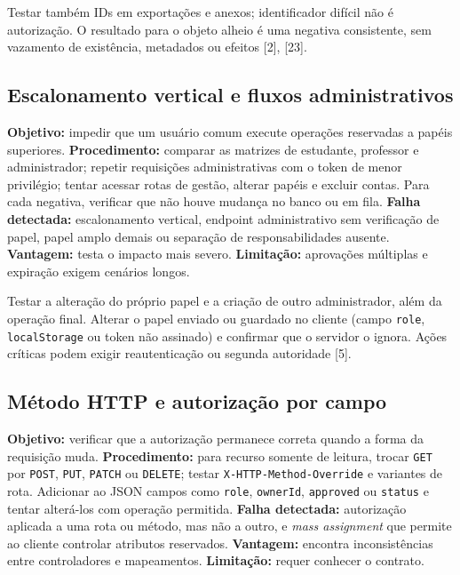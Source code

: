 Testar também IDs em exportações e anexos; identificador difícil não é
autorização. O resultado para o objeto alheio é uma negativa
consistente, sem vazamento de existência, metadados ou efeitos {[}2{]},
{[}23{]}.

\subsection{Escalonamento vertical e fluxos
administrativos}\label{escalonamento-vertical-e-fluxos-administrativos}

\textbf{Objetivo:} impedir que um usuário comum execute operações
reservadas a papéis superiores. \textbf{Procedimento:} comparar as
matrizes de estudante, professor e administrador; repetir requisições
administrativas com o token de menor privilégio; tentar acessar rotas de
gestão, alterar papéis e excluir contas. Para cada negativa, verificar
que não houve mudança no banco ou em fila. \textbf{Falha detectada:}
escalonamento vertical, endpoint administrativo sem verificação de
papel, papel amplo demais ou separação de responsabilidades ausente.
\textbf{Vantagem:} testa o impacto mais severo. \textbf{Limitação:}
aprovações múltiplas e expiração exigem cenários longos.

Testar a alteração do próprio papel e a criação de outro administrador,
além da operação final. Alterar o papel enviado ou guardado no cliente
(campo \texttt{role}, \texttt{localStorage} ou token não assinado) e
confirmar que o servidor o ignora. Ações críticas podem exigir
reautenticação ou segunda autoridade {[}5{]}.

\subsection{Método HTTP e autorização por
campo}\label{muxe9todo-http-e-autorizauxe7uxe3o-por-campo}

\textbf{Objetivo:} verificar que a autorização permanece correta quando
a forma da requisição muda. \textbf{Procedimento:} para recurso somente
de leitura, trocar \texttt{GET} por \texttt{POST}, \texttt{PUT},
\texttt{PATCH} ou \texttt{DELETE}; testar
\texttt{X-HTTP-Method-Override} e variantes de rota. Adicionar ao JSON
campos como \texttt{role}, \texttt{ownerId}, \texttt{approved} ou
\texttt{status} e tentar alterá-los com operação permitida.
\textbf{Falha detectada:} autorização aplicada a uma rota ou método, mas
não a outro, e \emph{mass assignment} que permite ao cliente controlar
atributos reservados. \textbf{Vantagem:} encontra inconsistências entre
controladores e mapeamentos. \textbf{Limitação:} requer conhecer o
contrato.

